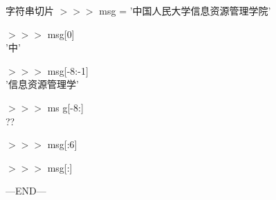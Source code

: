 \begin{frame}[fragile]{字符串切片}
    $>>>$ msg = '中国人民大学信息资源管理学院'

    $>>>$ msg[0] \\ '中'

    $>>>$ msg[-8:-1] \\ '信息资源管理学'

    $>>>$ ms g[-8:] \\ ??

    $>>>$ msg[:6] 

    $>>>$ msg[:]
\end{frame}


\begin{frame}[fragile]{---END---}
  \begin{center}
  \end{center}
\end{frame}

